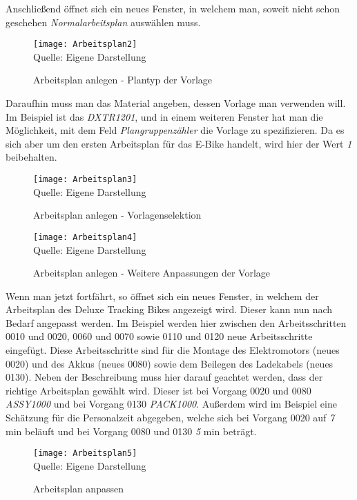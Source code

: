 Anschließend öffnet sich ein neues Fenster, in welchem man, soweit nicht schon geschehen \textit{Normalarbeitsplan} auswählen muss.

\begin{figure}[H]
    \caption{Arbeitsplan anlegen - Plantyp der Vorlage}\label{fig:arbeitsplan2}
    \texttt{[image: Arbeitsplan2]}
    \\
    Quelle: Eigene Darstellung
\end{figure}

Daraufhin muss man das Material angeben, dessen Vorlage man verwenden will. Im Beispiel ist das \textit{DXTR1201}, und in einem weiteren Fenster hat man 
die Möglichkeit, mit dem Feld \textit{Plangruppenzähler} die Vorlage zu spezifizieren. Da es sich aber um den ersten Arbeitsplan für das E-Bike handelt, wird hier der Wert \textit{1} beibehalten.

\begin{figure}[H]
    \caption{Arbeitsplan anlegen - Vorlagenselektion}\label{fig:arbeitsplan3}
    \texttt{[image: Arbeitsplan3]}
    \\
    Quelle: Eigene Darstellung
\end{figure}

\begin{figure}[H]
    \caption{Arbeitsplan anlegen - Weitere Anpassungen der Vorlage}\label{fig:arbeitsplan4}
    \texttt{[image: Arbeitsplan4]}
    \\
    Quelle: Eigene Darstellung
\end{figure}

Wenn man jetzt fortfährt, so öffnet sich ein neues Fenster, in welchem der Arbeitsplan des Deluxe Tracking Bikes angezeigt wird. Dieser kann nun nach Bedarf angepasst werden. Im Beispiel werden hier zwischen den Arbeitsschritten 0010 und 0020, 0060 und 0070 sowie 0110 und 0120 neue Arbeitsschritte eingefügt. Diese Arbeitsschritte sind für die Montage des Elektromotors (neues 0020) und des Akkus (neues 0080) sowie dem Beilegen des Ladekabels (neues 0130). Neben der Beschreibung muss hier darauf geachtet werden, 
dass der richtige Arbeitsplan gewählt wird. Dieser ist bei Vorgang 0020 und 0080 \textit{ASSY1000} und bei Vorgang 0130 \textit{PACK1000}. Außerdem wird im Beispiel eine Schätzung für die Personalzeit abgegeben, welche sich bei Vorgang 0020 auf \textit{7} min beläuft und bei Vorgang 0080 und 0130 \textit{5} min beträgt.

\begin{figure}[H]
    \caption{Arbeitsplan anpassen}\label{fig:arbeitsplan5}
    \texttt{[image: Arbeitsplan5]}
    \\
    Quelle: Eigene Darstellung
\end{figure}

